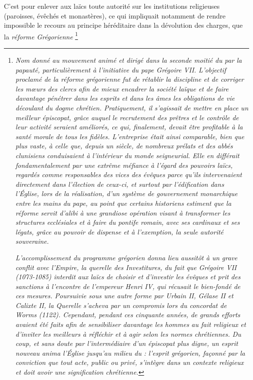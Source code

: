  C'est pour enlever aux laïcs toute autorité sur les institutions religieuses (paroisses, évêchés et monastères), ce qui impliquait notamment de rendre impossible le recours au principe héréditaire dans la dévolution des charges, que la \emph{réforme Grégorienne}%
\footnote{\emph{Nom donné au mouvement animé et dirigé dans la seconde moitié du  par la papauté, particulièrement à l'initiative du pape Grégoire VII. L'objectif proclamé de la réforme grégorienne fut de rétablir la discipline et de corriger les mœurs des clercs afin de mieux encadrer la société laïque et de faire davantage pénétrer dans les esprits et dans les âmes les obligations de vie découlant du dogme chrétien. Pratiquement, il s'agissait de mettre en place un meilleur épiscopat, grâce auquel le recrutement des prêtres et le contrôle de leur activité seraient améliorés, ce qui, finalement, devait être profitable à la santé morale de tous les fidèles. L'entreprise était ainsi comparable, bien que plus vaste, à celle que, depuis un siècle, de nombreux prélats et des abbés clunisiens conduisaient à l'intérieur du monde seigneurial. Elle en différait fondamentalement par une extrême méfiance à l'égard des pouvoirs laïcs, regardés comme responsables des vices des évêques parce qu'ils intervenaient directement dans l'élection de ceux-ci, et surtout par l'édification dans l'Église, lors de la réalisation, d'un système de gouvernement monarchique entre les mains du pape, au point que certains historiens estiment que la réforme servit d'alibi à une grandiose opération visant à transformer les structures ecclésiales et à faire du pontife romain, avec ses cardinaux et ses légats, grâce au pouvoir de dispense et à l'exemption, la seule autorité souveraine.}

\emph{L'accomplissement du programme grégorien donna lieu aussitôt à un grave conflit avec l'Empire, la querelle des Investitures, du fait que Grégoire VII (1073-1085) interdit aux laïcs de choisir et d'investir les évêques et prit des sanctions à l'encontre de l'empereur Henri IV, qui récusait le bien-fondé de ces mesures. Poursuivie sous une autre forme par Urbain II, Gélase II et Calixte II, la Querelle s'acheva par un compromis lors du concordat de Worms (1122). Cependant, pendant ces cinquante années, de grands efforts avaient été faits afin de sensibiliser davantage les hommes au fait religieux et d'inviter les meilleurs à réfléchir et à agir selon les normes chrétiennes. Du coup, et sans doute par l'intermédiaire d'un épiscopat plus digne, un esprit nouveau anima l'Église jusqu'au milieu du  : l'esprit grégorien, façonné par la conviction que tout acte, public ou privé, s'intègre dans un contexte religieux et doit avoir une signification chrétienne.}

}

